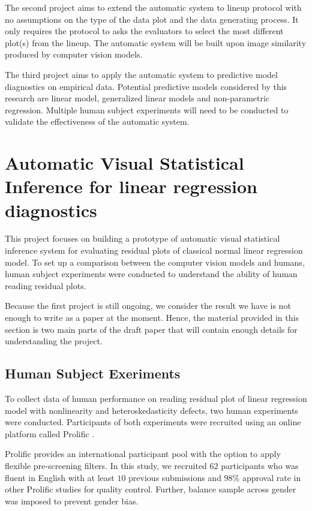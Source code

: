 \documentclass{monashthesis}
\theoremstyle{definition}
\theoremstyle{definition}
\theoremstyle{definition}
\theoremstyle{definition}
\theoremstyle{remark}
\begin{document}
The second project aims to extend the automatic system to lineup protocol with no assumptions on the type of the data plot and the data generating process. It only requires the protocol to asks the evaluators to select the most different plot(s) from the lineup. The automatic system will be built upon image similarity produced by computer vision models.

The third project aims to apply the automatic system to predictive model diagnostics on empirical data. Potential predictive models considered by this research are linear model, generalized linear models and non-parametric regression. Multiple human subject experiments will need to be conducted to validate the effectiveness of the automatic system.

\hypertarget{automatic-visual-statistical-inference-for-linear-regression-diagnostics}{%
\chapter{Automatic Visual Statistical Inference for linear regression diagnostics}\label{automatic-visual-statistical-inference-for-linear-regression-diagnostics}}

This project focuses on building a prototype of automatic visual statistical inference system for evaluating residual plots of classical normal linear regression model. To set up a comparison between the computer vision models and humans, human subject experiments were conducted to understand the ability of human reading residual plots.

Because the first project is still ongoing, we consider the result we have is not enough to write as a paper at the moment. Hence, the material provided in this section is two main parts of the draft paper that will contain enough details for understanding the project.

\hypertarget{human-subject-exeriments}{%
\section{Human Subject Exeriments}\label{human-subject-exeriments}}

To collect data of human performance on reading residual plot of linear regression model with nonlinearity and heteroskedasticity defects, two human experiments were conducted. Participants of both experiments were recruited using an online platform called Prolific \autocite{prolific_prolific_2022}.

Prolific provides an international participant pool with the option to apply flexible pre-screening filters. In this study, we recruited \(62\) participants who was fluent in English with at least \(10\) previous submissions and \(98\)\% approval rate in other Prolific studies for quality control. Further, balance sample across gender was imposed to prevent gender bias.
\end{document}
